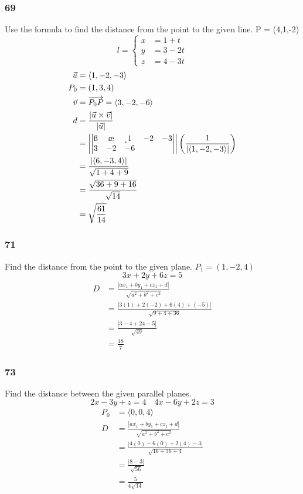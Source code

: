 \documentclass[letterpaper, 12pt]{math}
\begin{document}
\subsubsection*{69}
Use the formula to find the distance from the point to the given line.
P = (4,1,-2)
\[ l = \begin{cases}
  x &= 1+t \\
  y &= 3-2t \\
  z &= 4-3t
\end{cases} \]
\begin{align*}
  \vec{u} &= \langle1,-2,-3\rangle \\
  P_0 &= (1,3,4) \\
  \vec{v} &= \overrightarrow{P_0P} = \langle3,-2,-6\rangle \\
  d &= \frac{|\vec{u}\times\vec{v}|}{|\vec{u}|} \\
  &= \left|\begin{vmatrix}
    \i & \j & \k \\
    1 & -2 & -3 \\
    3 & -2 & -6
  \end{vmatrix}\right|\left(\frac{1}{|\langle1,-2,-3\rangle|}\right) \\
  &= \frac{|\langle6,-3,4\rangle|}{\sqrt{1+4+9}} \\
  &= \frac{\sqrt{36+9+16}}{\sqrt{14}} \\
  &= \sqrt{\frac{61}{14}}
\end{align*}

\subsubsection*{71}
Find the distance from the point to the given plane. \( P_1 = (1,-2,4) \)
\[ 3x+2y+6z = 5 \]
\begin{align*}
  D &= \frac{|ax_1+by_1+cz_1+d|}{\sqrt{a^2+b^2+c^2}} \\
  &= \frac{|3(1)+2(-2)+6(4)+(-5)|}{\sqrt{9+4+36}} \\
  &= \frac{|3-4+24-5|}{\sqrt{49}} \\
  &= \frac{18}{7}
\end{align*}

\subsubsection*{73}
Find the distance between the given parallel planes.
\[ 2x-3y+z = 4 \quad 4x-6y+2z = 3 \]
\begin{align*}
  P_0 &= \langle0,0,4\rangle \\
  D &= \frac{|ax_1+by_1+cz_1+d|}{\sqrt{a^2+b^2+c^2}} \\
  &= \frac{|4(0)-6(0)+2(4)-3|}{\sqrt{16+36+4}} \\
  &= \frac{|8-3|}{\sqrt{56}} \\
  &= \frac{5}{4\sqrt{14}}
\end{align*}
\end{document}
